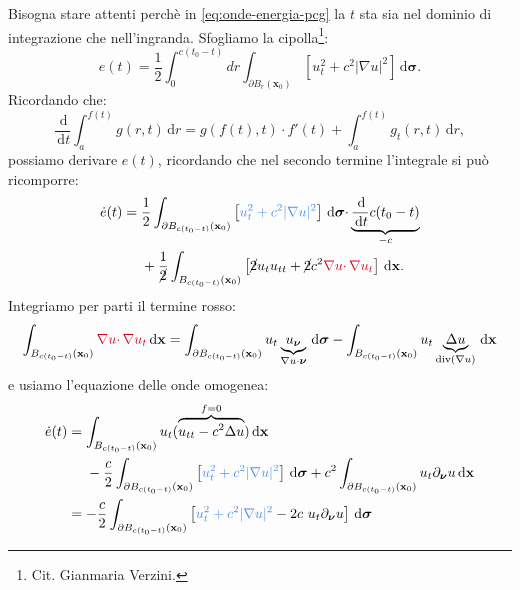 \documentclass[10pt,a4paper,twoside,openright]{book}
\newcommand{\x}{\mathbf{x}}
\newcommand{\sigg}{\bm{\sigma}}
\newcommand{\de}{\,\mathrm d}
\newcommand{\dr}{\de r}
\newcommand{\dt}{\de t}
\newcommand{\dxx}{\de \x}
\newcommand{\dsig}{\de \sigg}
\begin{document}
\begin{dimostrazione}
    Bisogna stare attenti perchè in \eqref{eq:onde-energia-pcg} la $t$ sta sia nel dominio di integrazione che nell'ingranda. Sfogliamo la cipolla\footnote{Cit. Gianmaria Verzini.}:
    \begin{equation*}
        e(t) =\frac{1}{2}\int _{0}^{c(t_{0} -t)} dr\int _{\partial B_{r}(\x_{0})}\left[ u_{t}^{2} +c^{2}| \nabla u| ^{2}\right] \dsig .
    \end{equation*}
    Ricordando che:
    \begin{equation*}
        \frac{\de}{\dt}\int _{a}^{f(t)} g(r,t) \dr=g(f(t),t) \cdotp f'(t) +\int _{a}^{f(t)} g_{t}(r,t) \dr,
    \end{equation*}
    possiamo derivare $e(t)$, ricordando che nel secondo termine l'integrale si può ricomporre:
    \begin{align*}
        \dot{e}(t) & =\frac{1}{2}\int _{\partial B_{c(t_{0} -t)}(\x_{0})}\left[\textcolor[rgb]{0.29,0.56,0.89}{u_{t}^{2}+c^{2}| \nabla u| ^{2}}\right] \dsig \cdotp \underbrace{\frac{\de}{\dt} c(t_{0} -t)}_{-c} \\
                   & \ \ \ \ +\frac{1}{\cancel{2}}\int _{B_{c(t_{0} -t)}(\x_{0})}\left[\cancel{2} u_{t} u_{tt} +\cancel{2} c^{2}\textcolor[rgb]{0.82,0.01,0.11}{\nabla u\cdotp \nabla u_{t}}\right] \dxx.
    \end{align*}
    Integriamo per parti il termine rosso:
    \begin{equation*}
        \int _{B_{c(t_{0} -t)}(\x_{0})}\textcolor[rgb]{0.82,0.01,0.11}{\nabla u\cdotp \nabla u_{t}} \dxx =\int _{\partial B_{c(t_{0} -t)}(\x_{0})} u_{t}\underbrace{u_{\bm{\nu }}}_{\nabla u\cdotp \bm{\nu }} \dsig -\int _{B_{c(t_{0} -t)}(\x_{0})} u_{t}\underbrace{\Delta u}_{\mathrm{div}(\nabla u)} \dxx
    \end{equation*}
    e usiamo l'equazione delle onde omogenea:
    \begin{align*}
        \dot{e}(t) & =\int _{B_{c(t_{0} -t)}(\x_{0})} u_{t}(\overbrace{u_{tt} -c^{2} \Delta u}^{f=0}) \dxx                                                                                                                                            \\
                   & \ \ \ \ -\frac{c}{2}\int _{\partial B_{c(t_{0} -t)}(\x_{0})}\left[\textcolor[rgb]{0.29,0.56,0.89}{u_{t}^{2}+c^{2}| \nabla u| ^{2}}\right] \dsig +c^{2}\int _{\partial B_{c(t_{0} -t)}(\x_{0})} u_{t} \partial _{\bm{\nu }} u\dxx \\
                   & =-\frac{c}{2}\int _{\partial B_{c(t_{0} -t)}(\x_{0})}\left[\textcolor[rgb]{0.29,0.56,0.89}{u_{t}^{2}+c^{2}| \nabla u| ^{2}} -2c\ u_{t} \partial _{\bm{\nu }} u\right] \dsig                                                      \\

\end{align*}
\end{dimostrazione}
\end{document}
